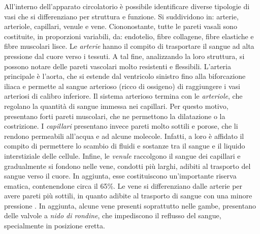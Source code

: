 All'interno dell'apparato circolatorio è possibile identificare diverse tipologie di vasi che si differenziano per struttura e funzione. Si suddividono in: arterie, arteriole, capillari, venule e vene. Ciononostante, tutte le pareti vasali sono costituite, in proporzioni variabili, da: endotelio, fibre collagene, fibre elastiche e fibre muscolari lisce. 
Le \textit{arterie} hanno il compito di trasportare il sangue ad alta pressione dal cuore verso i tessuti. A tal fine, analizzando la loro struttura, si possono notare delle pareti vascolari molto resistenti e flessibili. L'arteria principale è l'aorta, che si estende dal ventricolo sinistro  fino alla biforcazione iliaca e permette al sangue arterioso (ricco di ossigeno) di raggiungere i vasi arteriosi di calibro inferiore.
Il sistema arterioso termina con le \textit{arteriole}, che regolano la quantità di sangue immessa nei capillari. Per questo motivo, presentano forti pareti muscolari, che ne permettono la dilatazione o la costrizione.
I \textit{capillari} presentano invece pareti molto sottili e porose, che li rendono permeabili all'acqua e ad alcune molecole. Infatti, a loro è affidato il compito di permettere lo scambio di fluidi e sostanze tra il sangue e il liquido interstiziale delle cellule. 
Infine, le \textit{venule} raccolgono il sangue dei capillari e gradualmente si fondono nelle vene, condotti più larghi, adibiti al trasporto del sangue verso il cuore. In aggiunta, esse costituiscono un'importante riserva ematica, contenendone circa il 65\%. Le vene si differenziano dalle arterie per avere pareti più sottili, in quanto adibite al trasporto di sangue con una minore pressione \cite{Armentano2019}. In aggiunta, alcune vene presenti soprattutto nelle gambe, presentano delle valvole a \textit{nido di rondine}, che impediscono il reflusso del sangue, specialmente in posizione eretta. 

